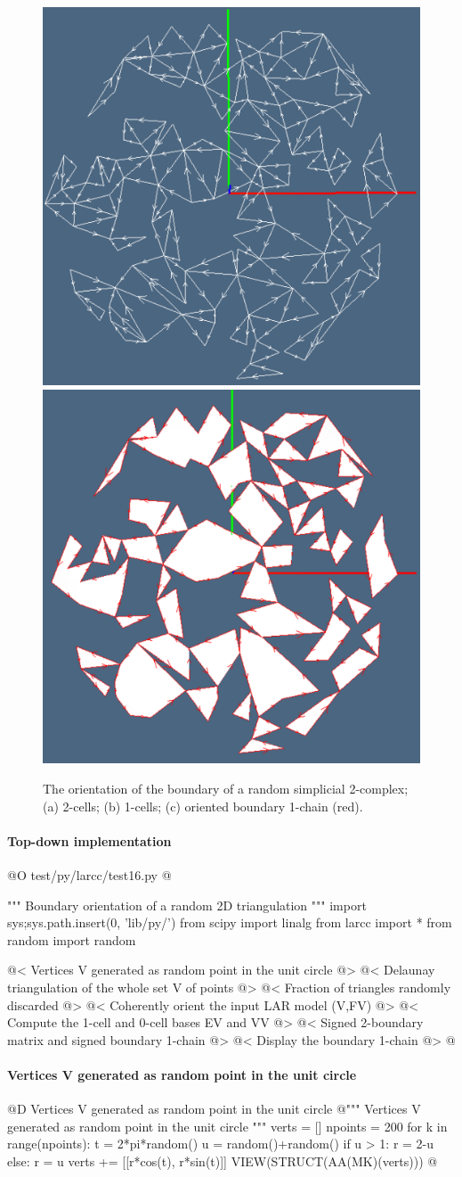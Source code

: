 \documentclass[11pt,oneside]{article}	%
\begin{document}
\begin{figure}[htbp]
   \includegraphics[height=0.328\linewidth,width=0.328\linewidth]{images/randomdelaunay2} 
   \includegraphics[height=0.328\linewidth,width=0.328\linewidth]{images/randomdelaunay3} 
   \caption{The orientation of the boundary of a random simplicial 2-complex;
   (a) 2-cells; (b) 1-cells; (c) oriented boundary 1-chain (red).}
   \label{randomdelaunay}
\end{figure}


\paragraph{Top-down implementation}

@O test/py/larcc/test16.py
@{""" Boundary orientation of a random 2D triangulation """
import sys;sys.path.insert(0, 'lib/py/')
from scipy import linalg
from larcc import *
from random import random

@< Vertices V generated as random point in the unit circle @>
@< Delaunay triangulation of the whole set V of points @>
@< Fraction of triangles randomly discarded @>
@< Coherently orient the input LAR model (V,FV)  @>
@< Compute the 1-cell and 0-cell bases EV and VV @>
@< Signed 2-boundary matrix and signed boundary 1-chain @>	
@< Display the boundary 1-chain @>
@}

\paragraph{Vertices V generated as random point in the unit circle}
@D Vertices V generated as random point in the unit circle
@{""" Vertices V generated as random point in the unit circle """
verts = []
npoints = 200
for k in range(npoints):
	t = 2*pi*random()
	u = random()+random()
	if u > 1: r = 2-u 
	else: r = u
	verts += [[r*cos(t), r*sin(t)]]
VIEW(STRUCT(AA(MK)(verts)))
@}
\end{document}

